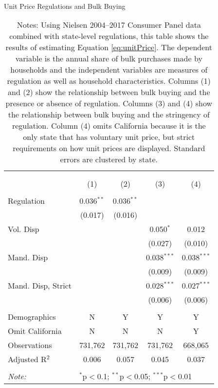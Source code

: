 \begin{table}[!htbp] \centering
  \caption{Unit Price Regulations and Bulk Buying}
  \label{tab:unitPriceLaw}
\begin{tabular}{@{\extracolsep{5pt}}lcccc}
\\[-1.8ex]\hline
\hline \\[-1.8ex]
\\[-1.8ex] & (1) & (2) & (3) & (4)\\
\hline \\[-1.8ex]
 Regulation & 0.036$^{**}$ & 0.036$^{**}$ &  &  \\
  & (0.017) & (0.016) &  &  \\
  Vol. Disp &  &  & 0.050$^{*}$ & 0.012 \\
  &  &  & (0.027) & (0.010) \\
  Mand. Disp &  &  & 0.038$^{***}$ & 0.038$^{***}$ \\
  &  &  & (0.009) & (0.009) \\
  Mand. Disp, Strict &  &  & 0.028$^{***}$ & 0.027$^{***}$ \\
  &  &  & (0.006) & (0.006) \\
 \hline \\[-1.8ex]
Demographics & N & Y & Y & Y \\
Omit California & N & N & N & Y \\
Observations & 731,762 & 731,762 & 731,762 & 668,065 \\
Adjusted R$^{2}$ & 0.006 & 0.057 & 0.045 & 0.037 \\
\hline
\hline \\[-1.8ex]
\textit{Note:}  & \multicolumn{4}{l}{$^{*}$p$<$0.1; $^{**}$p$<$0.05; $^{***}$p$<$0.01} \\
\end{tabular}
\caption*{Notes: Using Nielsen 2004--2017 Consumer Panel data combined with state-level regulations, this table shows the results of estimating Equation \ref{eq:unitPrice}. The dependent variable is the annual share of bulk purchases made by households and the independent variables are measures of regulation as well as household characteristics. Columns (1) and (2) show the relationship between bulk buying and the presence or absence of regulation. Columns (3) and (4) show the relationship between bulk buying and the stringency of regulation. Column (4) omits California because it is the only state that has voluntary unit price, but strict requirements on how unit prices are displayed. Standard errors are clustered by state.}
\end{table}
